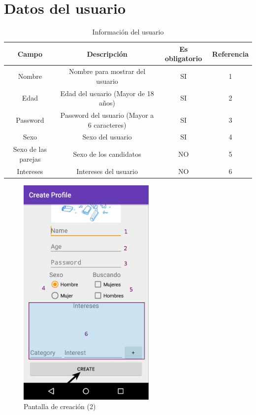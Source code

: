 \documentclass[10pt,letterpaper,extrafontsizes]{memoir}
\begin{document}
\section{Datos del usuario}\label{create}

\begin{table}[H]
\centering
\begin{tabular}{|c|c|c|c|}
\hline
Campo&Descripción&Es obligatorio&Referencia\\
\hline \hline
Nombre&Nombre para mostrar del usuario&SI&1\\ \hline
Edad&Edad del usuario (Mayor de 18 años)&SI&2\\ \hline
Password&Password del usuario (Mayor a 6 caracteres)&SI&3\\ \hline
Sexo&Sexo del usuario&SI&4\\ \hline
Sexo de las parejas&Sexo de los candidatos&NO&5\\ \hline
Intereses&Intereses del usuario&NO&6\\ \hline
\end{tabular}
\caption{Información del usuario}
\label{table:campos}
\end{table}

\begin{figure}[H]
    \centering
\includegraphics[width=0.6\textwidth]{graficos/capturas/j}
    \caption{Pantalla de creación (2)}
    \label{fig:createppagl2}
\end{figure}
\end{document}

